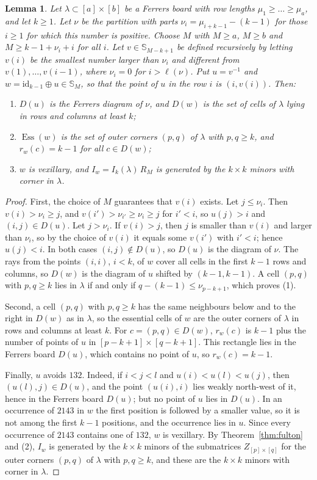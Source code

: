 \documentclass[11pt]{amsart}
\newtheorem{lemma}[theorem]{Lemma}
\theoremstyle{definition}
\theoremstyle{remark}
\newcommand{\bS}{\mathbb{S}}
\newcommand{\id}{\mathrm{id}}
\newcommand{\Ess}{\operatorname{Ess}}
\begin{document}
\begin{lemma}\label{lem:board-vex}
Let $\lambda\subset[a]\times[b]$ be a Ferrers board with row lengths $\mu_1\ge\dots\ge\mu_a$, and let $k\ge1$. Let $\nu$ be the partition with parts $\nu_i=\mu_{i+k-1}-(k-1)$ for those $i\ge1$ for which this number is positive. Choose $M$ with $M\ge a$, $M\ge b$ and $M\ge k-1+\nu_i+i$ for all $i$. Let $v\in\bS_{M-k+1}$ be defined recursively by letting $v(i)$ be the smallest number larger than $\nu_i$ and different from $v(1),\dots,v(i-1)$, where $\nu_i=0$ for $i>\ell(\nu)$. Put $u=v^{-1}$ and $w=\id_{k-1}\oplus u\in\bS_M$, so that the point of $u$ in the row $i$ is $(i,v(i))$. Then:
\begin{enumerate}
\item $D(u)$ is the Ferrers diagram of $\nu$, and $D(w)$ is the set of cells of $\lambda$ lying in rows and columns at least $k$;
\item $\Ess(w)$ is the set of outer corners $(p,q)$ of $\lambda$ with $p,q\ge k$, and $r_w(c)=k-1$ for all $c\in D(w)$;
\item $w$ is vexillary, and $I_w=I_k(\lambda)\,R_M$ is generated by the $k\times k$ minors with corner in $\lambda$.
\end{enumerate}
\end{lemma}

\begin{proof}
First, the choice of $M$ guarantees that $v(i)$ exists. Let $j\le\nu_i$. Then $v(i)>\nu_i\ge j$, and $v(i')>\nu_{i'}\ge\nu_i\ge j$ for $i'<i$, so $u(j)>i$ and $(i,j)\in D(u)$. Let $j>\nu_i$. If $v(i)>j$, then $j$ is smaller than $v(i)$ and larger than $\nu_i$, so by the choice of $v(i)$ it equals some $v(i')$ with $i'<i$; hence $u(j)<i$. In both cases $(i,j)\notin D(u)$, so $D(u)$ is the diagram of $\nu$. The rays from the points $(i,i)$, $i<k$, of $w$ cover all cells in the first $k-1$ rows and columns, so $D(w)$ is the diagram of $u$ shifted by $(k-1,k-1)$. A cell $(p,q)$ with $p,q\ge k$ lies in $\lambda$ if and only if $q-(k-1)\le\nu_{p-k+1}$, which proves (1).

Second, a cell $(p,q)$ with $p,q\ge k$ has the same neighbours below and to the right in $D(w)$ as in $\lambda$, so the essential cells of $w$ are the outer corners of $\lambda$ in rows and columns at least $k$. For $c=(p,q)\in D(w)$, $r_w(c)$ is $k-1$ plus the number of points of $u$ in $[p-k+1]\times[q-k+1]$. This rectangle lies in the Ferrers board $D(u)$, which contains no point of $u$, so $r_w(c)=k-1$.

Finally, $u$ avoids $132$. Indeed, if $i<j<l$ and $u(i)<u(l)<u(j)$, then $(u(l),j)\in D(u)$, and the point $(u(i),i)$ lies weakly north-west of it, hence in the Ferrers board $D(u)$; but no point of $u$ lies in $D(u)$. In an occurrence of $2143$ in $w$ the first position is followed by a smaller value, so it is not among the first $k-1$ positions, and the occurrence lies in $u$. Since every occurrence of $2143$ contains one of $132$, $w$ is vexillary. By Theorem~\ref{thm:fulton} and (2), $I_w$ is generated by the $k\times k$ minors of the submatrices $Z_{[p]\times[q]}$ for the outer corners $(p,q)$ of $\lambda$ with $p,q\ge k$, and these are the $k\times k$ minors with corner in $\lambda$.
\end{proof}
\end{document}
